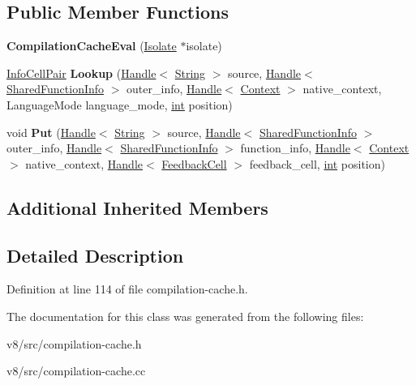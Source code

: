 \subsection*{Public Member Functions}
\begin{DoxyCompactItemize}
\item 
\mbox{\label{classv8_1_1internal_1_1CompilationCacheEval_aa14f106ba2f88d89f56a25ed5968785c}} 
{\bfseries Compilation\+Cache\+Eval} (\mbox{\hyperlink{classv8_1_1internal_1_1Isolate}{Isolate}} $\ast$isolate)
\item 
\mbox{\label{classv8_1_1internal_1_1CompilationCacheEval_afcf4155a063581d019effadc5b7df273}} 
\mbox{\hyperlink{classv8_1_1internal_1_1InfoCellPair}{Info\+Cell\+Pair}} {\bfseries Lookup} (\mbox{\hyperlink{classv8_1_1internal_1_1Handle}{Handle}}$<$ \mbox{\hyperlink{classv8_1_1internal_1_1String}{String}} $>$ source, \mbox{\hyperlink{classv8_1_1internal_1_1Handle}{Handle}}$<$ \mbox{\hyperlink{classv8_1_1internal_1_1SharedFunctionInfo}{Shared\+Function\+Info}} $>$ outer\+\_\+info, \mbox{\hyperlink{classv8_1_1internal_1_1Handle}{Handle}}$<$ \mbox{\hyperlink{classv8_1_1internal_1_1Context}{Context}} $>$ native\+\_\+context, Language\+Mode language\+\_\+mode, \mbox{\hyperlink{classint}{int}} position)
\item 
\mbox{\label{classv8_1_1internal_1_1CompilationCacheEval_abd4f92c5bf11916fc1b9b9e868831be1}} 
void {\bfseries Put} (\mbox{\hyperlink{classv8_1_1internal_1_1Handle}{Handle}}$<$ \mbox{\hyperlink{classv8_1_1internal_1_1String}{String}} $>$ source, \mbox{\hyperlink{classv8_1_1internal_1_1Handle}{Handle}}$<$ \mbox{\hyperlink{classv8_1_1internal_1_1SharedFunctionInfo}{Shared\+Function\+Info}} $>$ outer\+\_\+info, \mbox{\hyperlink{classv8_1_1internal_1_1Handle}{Handle}}$<$ \mbox{\hyperlink{classv8_1_1internal_1_1SharedFunctionInfo}{Shared\+Function\+Info}} $>$ function\+\_\+info, \mbox{\hyperlink{classv8_1_1internal_1_1Handle}{Handle}}$<$ \mbox{\hyperlink{classv8_1_1internal_1_1Context}{Context}} $>$ native\+\_\+context, \mbox{\hyperlink{classv8_1_1internal_1_1Handle}{Handle}}$<$ \mbox{\hyperlink{classv8_1_1internal_1_1FeedbackCell}{Feedback\+Cell}} $>$ feedback\+\_\+cell, \mbox{\hyperlink{classint}{int}} position)
\end{DoxyCompactItemize}
\subsection*{Additional Inherited Members}


\subsection{Detailed Description}


Definition at line 114 of file compilation-\/cache.\+h.



The documentation for this class was generated from the following files\+:\begin{DoxyCompactItemize}
\item 
v8/src/compilation-\/cache.\+h\item 
v8/src/compilation-\/cache.\+cc\end{DoxyCompactItemize}
